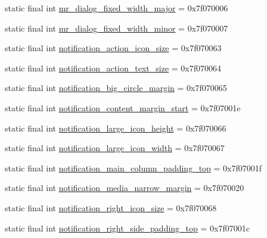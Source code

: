 \begin{CompactItemize}
\item 
static final int \hyperlink{classcom_1_1companyname_1_1x__2doo_1_1_r_1_1dimen_69fa1cf25ac5a6c9cfb1f28d2cb0cb9d}{mr\_\-dialog\_\-fixed\_\-width\_\-major} = 0x7f070006
\item 
static final int \hyperlink{classcom_1_1companyname_1_1x__2doo_1_1_r_1_1dimen_8cb9951c4f7795e40ff011b4111c03b4}{mr\_\-dialog\_\-fixed\_\-width\_\-minor} = 0x7f070007
\item 
static final int \hyperlink{classcom_1_1companyname_1_1x__2doo_1_1_r_1_1dimen_c912d3f510dd2f344b64cc2920d21a22}{notification\_\-action\_\-icon\_\-size} = 0x7f070063
\item 
static final int \hyperlink{classcom_1_1companyname_1_1x__2doo_1_1_r_1_1dimen_f4975a948906eb94e321f08d99e8fb2b}{notification\_\-action\_\-text\_\-size} = 0x7f070064
\item 
static final int \hyperlink{classcom_1_1companyname_1_1x__2doo_1_1_r_1_1dimen_6086343ad733acd8252117b39e64b294}{notification\_\-big\_\-circle\_\-margin} = 0x7f070065
\item 
static final int \hyperlink{classcom_1_1companyname_1_1x__2doo_1_1_r_1_1dimen_fd22a7ac13d81439d1f6655756f807be}{notification\_\-content\_\-margin\_\-start} = 0x7f07001e
\item 
static final int \hyperlink{classcom_1_1companyname_1_1x__2doo_1_1_r_1_1dimen_f070b85cde4ab7d78bcecf9391c3f991}{notification\_\-large\_\-icon\_\-height} = 0x7f070066
\item 
static final int \hyperlink{classcom_1_1companyname_1_1x__2doo_1_1_r_1_1dimen_02665378d407c1f6dcc1ece286610217}{notification\_\-large\_\-icon\_\-width} = 0x7f070067
\item 
static final int \hyperlink{classcom_1_1companyname_1_1x__2doo_1_1_r_1_1dimen_d1c4d1b2629ddb058a371cb78128dc75}{notification\_\-main\_\-column\_\-padding\_\-top} = 0x7f07001f
\item 
static final int \hyperlink{classcom_1_1companyname_1_1x__2doo_1_1_r_1_1dimen_a600b107b18cb163fb7e804aa2f365c8}{notification\_\-media\_\-narrow\_\-margin} = 0x7f070020
\item 
static final int \hyperlink{classcom_1_1companyname_1_1x__2doo_1_1_r_1_1dimen_8202321be0f57d7d5f2a1eb8d689c701}{notification\_\-right\_\-icon\_\-size} = 0x7f070068
\item 
static final int \hyperlink{classcom_1_1companyname_1_1x__2doo_1_1_r_1_1dimen_481176bb9ac0862d52b654ae8841ffb5}{notification\_\-right\_\-side\_\-padding\_\-top} = 0x7f07001c
\item 

\end{CompactItemize}
